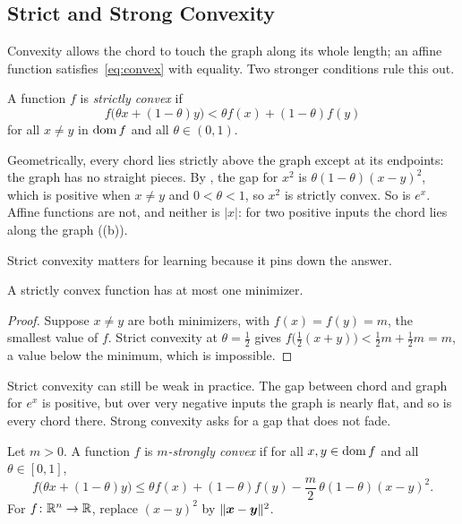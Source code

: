\subsection{Strict and Strong Convexity}
\label{sec:ch01-strict-strong}

Convexity allows the chord to touch the graph along its whole length; an
affine function satisfies~\eqref{eq:convex} with equality. Two stronger
conditions rule this out.

\begin{definition}
  \label{def:strictly-convex}
  A function $f$ is \emph{strictly convex} if
  \[
    f\bigl(\theta x + (1 - \theta) y\bigr) < \theta f(x) + (1 - \theta) f(y)
  \]
  for all $x \ne y$ in $\operatorname{dom} f$ and all $\theta \in (0, 1)$.
\end{definition}

Geometrically, every chord lies strictly above the graph except at its
endpoints: the graph has no straight pieces. By , the
gap for $x^2$ is $\theta (1 - \theta)(x - y)^2$, which is positive when
$x \ne y$ and $0 < \theta < 1$, so $x^2$ is strictly convex. So is $e^x$.
Affine functions are not, and neither is $|x|$: for two positive inputs the
chord lies along the graph ((b)).

Strict convexity matters for learning because it pins down the answer.

\begin{proposition}
  \label{prop:ch01-unique-min}
  A strictly convex function has at most one minimizer.
\end{proposition}

\begin{proof}
  Suppose $x \ne y$ are both minimizers, with $f(x) = f(y) = m$, the
  smallest value of $f$. Strict convexity at $\theta = \tfrac12$ gives
  $f\bigl(\tfrac12 (x + y)\bigr) < \tfrac12 m + \tfrac12 m = m$, a value
  below the minimum, which is impossible.
\end{proof}

Strict convexity can still be weak in practice. The gap between chord and
graph for $e^x$ is positive, but over very negative inputs the graph is
nearly flat, and so is every chord there. Strong convexity asks for a gap
that does not fade.

\begin{definition}
  \label{def:strongly-convex}
  Let $m > 0$. A function $f$ is \emph{$m$-strongly convex} if for all
  $x, y \in \operatorname{dom} f$ and all $\theta \in [0, 1]$,
  \[
    f\bigl(\theta x + (1 - \theta) y\bigr)
    \le \theta f(x) + (1 - \theta) f(y)
      - \frac{m}{2}\, \theta (1 - \theta) (x - y)^2 .
  \]
  For $f\colon \mathbb{R}^n \to \mathbb{R}$, replace $(x - y)^2$ by
  $\|\bm{x} - \bm{y}\|^2$.
\end{definition}

